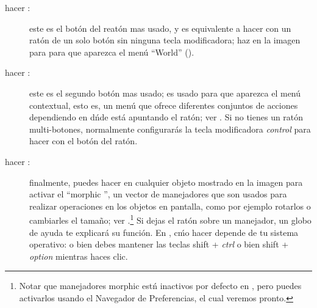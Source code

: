 \documentclass[a4paper,10pt,twoside]{book}
\begin{document}
\begin{description}
\item [hacer \click:] este es el bot\'on del reat\'on mas usado, y es equivalente a hacer \click con un rat\'on de un solo bot\'on sin ninguna tecla modificadora; haz \click en la imagen para para que aparezca el men\'u ``World'' ().
\item [hacer \actclick:] este es el segundo bot\'on mas usado; es usado para que aparezca el men\'u contextual, esto es, un men\'u que ofrece diferentes conjuntos de acciones dependiendo en d\'nde est\'a apuntando el rat\'on; ver . Si no tienes un rat\'on multi-botones, normalmente configurar\'as la tecla modificadora \emph{control} para hacer \actclick con el bot\'on del rat\'on.
\item [hacer \metaclick:] finalmente, puedes hacer \metaclick en cualquier objeto mostrado en la imagen para activar el ``morphic '', un vector de manejadores que son usados para realizar operaciones en los objetos en pantalla, como por ejemplo rotarlos o cambiarles el tama\~no; ver .\footnote{Notar que manejadores morphic est\'n inactivos por defecto en \pharo, pero puedes activarlos usando el Navegador de Preferencias, el cual veremos pronto.}
Si dejas el rat\'on sobre un manejador, un globo de ayuda te explicar\'a su funci\'on.
En \pharo, c\'mo hacer \metaclick depende de tu sistema operativo:
o bien debes mantener las teclas {\sc shift} + \emph{ctrl} o bien {\sc shift} + \emph{option} mientras haces clic.
\end{description}




\end{document}
